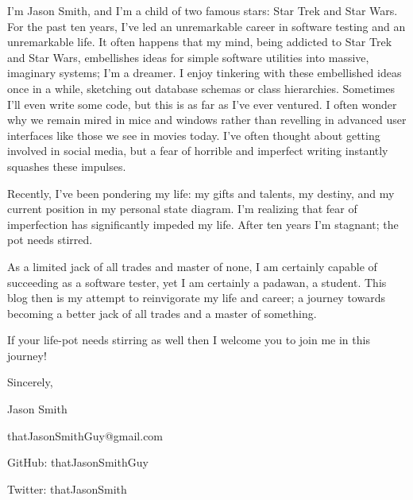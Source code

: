 \documentclass[letterpaper,12pt]{article}
\begin{document}
I'm Jason Smith, and I'm a child of two famous stars: Star Trek and Star Wars. For the past ten years, I've led an unremarkable career in software testing and an unremarkable life. It often happens that my mind, being addicted to Star Trek and Star Wars, embellishes ideas for simple software utilities into massive, imaginary systems; I'm a dreamer. I enjoy tinkering with these embellished ideas once in a while, sketching out database schemas or class hierarchies. Sometimes I'll even write some code, but this is as far as I've ever ventured. I often wonder why we remain mired in mice and windows rather than revelling in advanced user interfaces like those we see in movies today. I've often thought about getting involved in social media, but a fear of horrible and imperfect writing instantly squashes these impulses.

Recently, I've been pondering my life: my gifts and talents, my destiny, and my current position in my personal state diagram. I'm realizing that fear of imperfection has significantly impeded my life. After ten years I'm stagnant; the pot needs stirred.

As a limited jack of all trades and master of none, I am certainly capable of succeeding as a software tester, yet I am certainly a padawan, a student. This blog then is my attempt to reinvigorate my life and career; a journey towards becoming a better jack of all trades and a master of something.

If your life-pot needs stirring as well then I welcome you to join me in this journey!

Sincerely,

Jason Smith

thatJasonSmithGuy@gmail.com

GitHub: thatJasonSmithGuy

Twitter: thatJasonSmith
\end{document}
